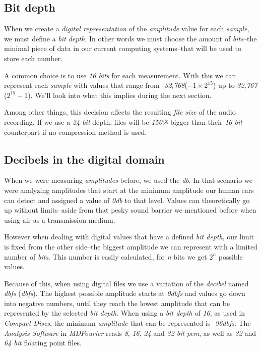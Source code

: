 \documentclass[10pt,a4paper]{report}
\newcommand{\define}[1]{\textit{\acrlong{#1}} (\textit{\acrshort{#1}})}
\newcommand{\ac}[1]{\textit{\mbox{\acrshort{#1}}}}
\newcommand{\dbfs}[1]{\textit{\mbox{#1\acrshort{dbfs}}}}
\newcommand{\dbSPL}[1]{\textit{\mbox{#1\acrshort{db}}}}
\begin{document}
\subsection{Bit depth}

When we create a \textit{digital representation} of the \textit{amplitude} value for each \textit{sample}, we must define a \textit{bit depth}. In other words we must choose the amount of \textit{bits}--the minimal piece of data in our current computing systems--that will be used to store each number. 

A common choice is to use \textit{16 bits} for each measurement. With this we can represent each \textit{sample} with values that range from \textit{-32,768}($-1\times2^{15}$) up to \textit{32,767} ($2^{15}-1$). We'll look into what this implies during the next section.

Among other things, this decision affects the resulting \textit{file size} of the audio recording. If we use a \textit{24 bit} depth, files will be \textit{150\%} bigger than their \textit{16 bit} counterpart if no compression method is used.


\subsection{Decibels in the digital domain}

When we were measuring \textit{amplitudes} before, we used the \ac{db}. In that scenario we were analyzing amplitudes that start at the minimum amplitude our human ears can detect and assigned a value of \dbSPL{0} to that level. Values can theoretically go up without limits--aside from that pesky sound barrier we mentioned before when using air as a transmission medium.

However when dealing with digital values that have a defined \textit{bit depth}, our limit is fixed from the other side--the biggest amplitude we can represent with a limited number of \textit{bits}. This number is easily calculated, for \textit{n} bits we get $2^n$ possible values.

Because of this, when using digital files we use a variation of the \textit{decibel} named \define{dbfs}. The highest possible amplitude starts at \dbfs{0} and values go down into negative numbers, until they reach the lowest amplitude that can be represented by the selected \textit{bit depth}. When using a \textit{bit depth} of \textit{16}, as used in \textit{Compact Discs}, the minimum \textit{amplitude} that can be represented is \dbfs{-96}. The \textit{Analysis Software} in \textit{MDFourier} reads \textit{8}, \textit{16}, \textit{24} and \textit{32 bit} \ac{pcm}, as well as \textit{32} and \textit{64 bit} floating point files.
\end{document}
